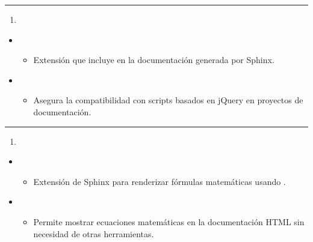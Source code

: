 \documentclass[a4paper,10pt,oneside,spanish,openany]{sphinxmanual}
\begin{document}
\bigskip\hrule\bigskip

\begin{enumerate}
%
\setcounter{enumi}{34}
\item {} 
\sphinxAtStartPar
{}

\end{enumerate}
\begin{itemize}
\item {} 
\sphinxAtStartPar
{}
\begin{itemize}
\item {} 
\sphinxAtStartPar
Extensión que incluye  en la documentación generada por Sphinx.

\end{itemize}

\item {} 
\sphinxAtStartPar
{}
\begin{itemize}
\item {} 
\sphinxAtStartPar
Asegura la compatibilidad con scripts basados en jQuery en proyectos de documentación.

\end{itemize}

\end{itemize}


\bigskip\hrule\bigskip

\begin{enumerate}
%
\setcounter{enumi}{35}
\item {} 
\sphinxAtStartPar
{}

\end{enumerate}
\begin{itemize}
\item {} 
\sphinxAtStartPar
{}
\begin{itemize}
\item {} 
\sphinxAtStartPar
Extensión de Sphinx para renderizar fórmulas matemáticas usando .

\end{itemize}

\item {} 
\sphinxAtStartPar
{}
\begin{itemize}
\item {} 
\sphinxAtStartPar
Permite mostrar ecuaciones matemáticas en la documentación HTML sin necesidad de otras herramientas.

\end{itemize}

\end{itemize}
\end{document}

